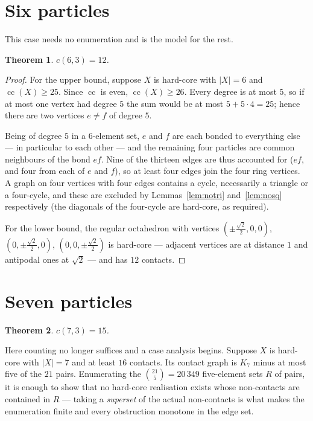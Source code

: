 \documentclass[11pt,a4paper]{article}
\theoremstyle{plain}
\newtheorem{theorem}{Theorem}[section]
\theoremstyle{definition}
\newcommand{\card}[1]{\lvert #1 \rvert}
\begin{document}
\section{Six particles}
\label{sec:six}

This case needs no enumeration and is the model for the rest.

\begin{theorem}
\label{thm:six}
$c(6,3) = 12$.
\end{theorem}

\begin{proof}
For the upper bound, suppose $X$ is hard-core with $\card X = 6$ and
$\operatorname{cc}(X) \ge 25$. Since $\operatorname{cc}$ is even, $\operatorname{cc}(X)
\ge 26$. Every degree is at most $5$, so if at most one vertex had degree $5$ the sum
would be at most $5 + 5\cdot 4 = 25$; hence there are two vertices $e \ne f$ of degree
$5$.

Being of degree $5$ in a $6$-element set, $e$ and $f$ are each bonded to everything
else --- in particular to each other --- and the remaining four particles are common
neighbours of the bond $ef$. Nine of the thirteen edges are thus accounted for
($ef$, and four from each of $e$ and $f$), so at least four edges join the four
ring vertices. A graph on four vertices with four edges contains a cycle, necessarily
a triangle or a four-cycle, and these are excluded by Lemmas~\ref{lem:notri}
and~\ref{lem:nosq} respectively (the diagonals of the four-cycle are hard-core, as
required).

For the lower bound, the regular octahedron with vertices
$(\pm\tfrac{\sqrt2}{2},0,0)$, $(0,\pm\tfrac{\sqrt2}{2},0)$,
$(0,0,\pm\tfrac{\sqrt2}{2})$ is hard-core --- adjacent vertices are at distance $1$ and
antipodal ones at $\sqrt2$ --- and has $12$ contacts.
\end{proof}

\section{Seven particles}
\label{sec:seven}

\begin{theorem}
\label{thm:seven}
$c(7,3) = 15$.
\end{theorem}

Here counting no longer suffices and a case analysis begins. Suppose $X$ is hard-core
with $\card X = 7$ and at least $16$ contacts. Its contact graph is $K_7$ minus at most
five of the $21$ pairs. Enumerating the $\binom{21}{5} = 20\,349$ five-element sets $R$
of pairs, it is enough to show that no hard-core realisation exists whose non-contacts
are contained in $R$ --- taking a \emph{superset} of the actual non-contacts is what
makes the enumeration finite and every obstruction monotone in the edge set.
\end{document}
